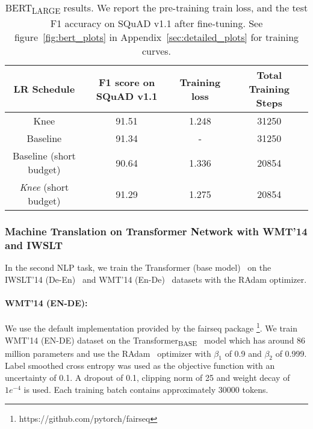 \documentclass[twoside,11pt]{article}
\newcommand{\lrscheduleshort}{\textit{Knee}}
\begin{document}
\vspace{-4pt}
\begin{table}[h]
\small
\centering
\caption{BERT\textsubscript{LARGE} results. We report the pre-training train loss, and the test F1 accuracy on SQuAD v1.1 after fine-tuning. See figure~\ref{fig:bert_plots} in Appendix~\ref{sec:detailed_plots} for training curves.}
\label{tab:bert_pretraining}
\begin{tabular}{cccc}
\toprule
LR Schedule  & F1 score on SQuAD v1.1 & Training loss & Total Training Steps \\ 
\midrule
Knee & 91.51  & 1.248 & 31250\\
Baseline \citep{bert76lamb} &  91.34 & - & 31250 \\
Baseline (short budget)   & 90.64  & 1.336 & 20854\\
\lrscheduleshort{} (short budget)  & 91.29 & 1.275 & 20854\\
\bottomrule
\end{tabular}
\end{table}


\subsubsection{Machine Translation on Transformer Network with WMT'14 and IWSLT}

In the second NLP task, we train the Transformer (base model)~\citep{vaswani2017attention} on the IWSLT'14 (De-En)~\citep{iwslt_dataset_cettolo2014} and  WMT'14 (En-De)~\citep{wmt14translation}   datasets with the RAdam \citep{liu2019variance_radam} optimizer.


\paragraph{WMT'14 (EN-DE):}We use the default implementation provided by the fairseq package \citep{ott2019fairseq} \footnote{https://github.com/pytorch/fairseq}. We train WMT'14 (EN-DE) dataset on the Transformer\textsubscript{BASE}~\citep{vaswani2017attention} model which has around 86 million parameters and use the RAdam~\citep{liu2019variance_radam} optimizer with $\beta_{1}$ of 0.9 and $\beta_{2}$ of 0.999. Label smoothed cross entropy was used as the objective function with an uncertainty of 0.1. A dropout of 0.1, clipping norm of 25 and weight decay of $1e^{-4}$ is used. Each training batch contains approximately 30000 tokens.
\end{document}
